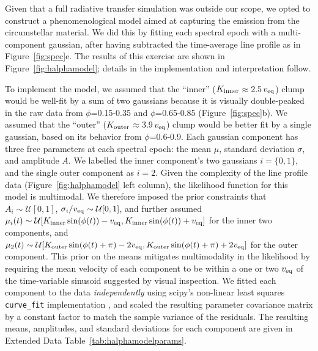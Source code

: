 \documentclass{nature3}
\begin{document}
\begin{methods}
Given that a full radiative transfer simulation was outside our scope,
we opted to construct a phenomenological model aimed at capturing the
emission from the circumstellar material.  We did this by fitting each
spectral epoch with a multi-component gaussian, after having
subtracted the time-average line profile as in Figure~\ref{fig:spec}e.
The results of this exercise are shown in
Figure~\ref{fig:halphamodel}; details in the implementation and
interpretation follow.

To implement the model, we assumed that the ``inner'' ($K_{\rm
inner}$$\approx$2.5\,$v_{\rm eq}$) clump would be well-fit by a sum of
two gaussians because it is visually double-peaked in the raw data
from $\phi$=0.15-0.35 and $\phi$=0.65-0.85 (Figure~\ref{fig:spec}b).
We assumed that the ``outer'' ($K_{\rm outer}$$\approx$3.9\,$v_{\rm
eq}$) clump would be better fit by a single gaussian, based on its
behavior from $\phi$=0.6-0.9.  Each gaussian component has three free
parameters at each spectral epoch: the mean $\mu$, standard deviation
$\sigma$, and amplitude $A$.  We labelled the inner component's two
gaussians $i=\{ 0, 1 \}$, and the single outer component as $i=2$.
Given the complexity of the line profile data
(Figure~\ref{fig:halphamodel} left column), the likelihood function
for this model is multimodal.  We therefore imposed the prior
constraints that $A_i \sim \mathcal{U}[0,1]$,
$\sigma_i/v_{\rm eq} \sim \mathcal{U}[0,1]$, and further assumed
$\mu_i(t) \sim
\mathcal{U}[
  K_{\rm inner}\sin(\phi(t)) - v_{\rm eq},
  K_{\rm inner}\sin(\phi(t)) + v_{\rm eq}
]$
for the inner two components, and
$\mu_2(t) \sim
\mathcal{U}[
  K_{\rm outer}\sin(\phi(t) + \pi) - 2v_{\rm eq},
  K_{\rm outer}\sin(\phi(t) + \pi) + 2v_{\rm eq}
]$
for the outer component.  This prior on the means mitigates
multimodality in the likelihood by requiring the mean velocity of each
component to be within a one or two $v_{\rm eq}$ of the time-variable
sinusoid suggested by visual inspection.  We fitted each component to
the data {\it independently} using scipy's non-linear least squares
\texttt{curve\_fit} implementation \cite{Virtanen2020}, and scaled the
resulting parameter covariance matrix by a constant factor to match
the sample variance of the residuals.  The resulting means,
amplitudes, and standard deviations for each component are given in
Extended Data Table~\ref{tab:halphamodelparams}.


\end{methods}
\end{document}
